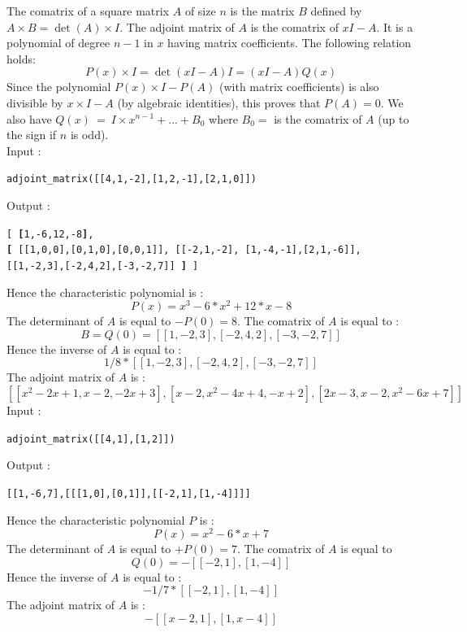 \documentclass[a4paper,11pt]{book}
\begin{document}
The comatrix of a square matrix $A$ of size $n$ is the matrix $B$ 
defined by $A\times B=\det(A)\times I$. The adjoint matrix of $A$
is the comatrix of $xI-A$. It is a polynomial of degree $n-1$ in $x$
having matrix coefficients.
The following relation holds:
\[ P(x)\times I=\det(xI-A)I=(xI-A)Q(x)\]
Since the polynomial $P(x)\times I-P(A)$ (with matrix coefficients)
is also divisible by $x\times I-A$ (by algebraic identities), 
this proves that $P(A)=0$.
We also have $Q(x)\ =\ I\times  x^{n-1}+...+B_0 $ 
where $B_0=$ is the comatrix of $A$ (up to the sign if $n$ is odd).\\
Input :
\begin{center}{\tt adjoint\_matrix([[4,1,-2],[1,2,-1],[2,1,0]])}\end{center}
Output :
\begin{center}
{\tt [
  {\bf [}1,-6,12,-8{\bf ]},\\
{\bf [} [[1,0,0],[0,1,0],[0,0,1]],
  [[-2,1,-2], [1,-4,-1],[2,1,-6]],
  [[1,-2,3],[-2,4,2],[-3,-2,7]] {\bf ]}
] }\end{center}
Hence the characteristic polynomial is :
\[ P(x)=x^3-6*x^2+12*x-8 \]
The determinant of $A$ is equal to $-P(0)=8$.
The comatrix of $A$ is equal to :
\[ B=Q(0)=[[1,-2,3],[-2,4,2],[-3,-2,7]] \]
Hence the inverse of $A$ is equal to :
\[ 1/8*[[1,-2,3],[-2,4,2],[-3,-2,7]] \]
The adjoint matrix of $A$ is :
\[ [[x^2-2x+1,x-2,-2x+3],[x-2,x^2-4x+4,-x+2],[2x-3,x-2,x^2-6x+7]] \]
Input :
\begin{center}{\tt adjoint\_matrix([[4,1],[1,2]])}\end{center}
Output :
\begin{center}{\tt[[1,-6,7],[[[1,0],[0,1]],[[-2,1],[1,-4]]]]}\end{center}
Hence the characteristic polynomial $P$ is :
\[ P(x)=x^2-6*x+7 \]
The determinant of $A$ is equal to $+P(0)=7$.
The comatrix of $A$ is equal to 
\[ Q(0)= -[[-2,1],[1,-4]] \]
Hence the inverse of $A$ is equal to :
\[ -1/7*[[-2,1],[1,-4]] \]
The adjoint matrix of $A$ is :
\[ -[[x-2,1],[1,x-4]] \]
\end{document}
